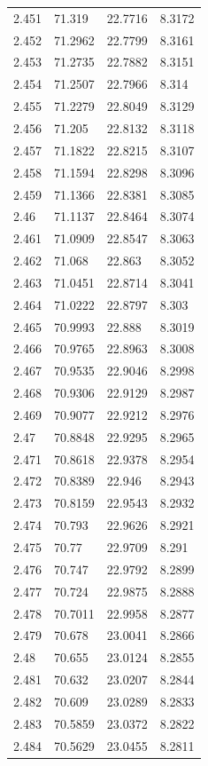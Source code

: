 \begin{tabular}{llll}
2.451 & 71.319 & 22.7716 & 8.3172 \\
2.452 & 71.2962 & 22.7799 & 8.3161 \\
2.453 & 71.2735 & 22.7882 & 8.3151 \\
2.454 & 71.2507 & 22.7966 & 8.314 \\
2.455 & 71.2279 & 22.8049 & 8.3129 \\
2.456 & 71.205 & 22.8132 & 8.3118 \\
2.457 & 71.1822 & 22.8215 & 8.3107 \\
2.458 & 71.1594 & 22.8298 & 8.3096 \\
2.459 & 71.1366 & 22.8381 & 8.3085 \\
2.46 & 71.1137 & 22.8464 & 8.3074 \\
2.461 & 71.0909 & 22.8547 & 8.3063 \\
2.462 & 71.068 & 22.863 & 8.3052 \\
2.463 & 71.0451 & 22.8714 & 8.3041 \\
2.464 & 71.0222 & 22.8797 & 8.303 \\
2.465 & 70.9993 & 22.888 & 8.3019 \\
2.466 & 70.9765 & 22.8963 & 8.3008 \\
2.467 & 70.9535 & 22.9046 & 8.2998 \\
2.468 & 70.9306 & 22.9129 & 8.2987 \\
2.469 & 70.9077 & 22.9212 & 8.2976 \\
2.47 & 70.8848 & 22.9295 & 8.2965 \\
2.471 & 70.8618 & 22.9378 & 8.2954 \\
2.472 & 70.8389 & 22.946 & 8.2943 \\
2.473 & 70.8159 & 22.9543 & 8.2932 \\
2.474 & 70.793 & 22.9626 & 8.2921 \\
2.475 & 70.77 & 22.9709 & 8.291 \\
2.476 & 70.747 & 22.9792 & 8.2899 \\
2.477 & 70.724 & 22.9875 & 8.2888 \\
2.478 & 70.7011 & 22.9958 & 8.2877 \\
2.479 & 70.678 & 23.0041 & 8.2866 \\
2.48 & 70.655 & 23.0124 & 8.2855 \\
2.481 & 70.632 & 23.0207 & 8.2844 \\
2.482 & 70.609 & 23.0289 & 8.2833 \\
2.483 & 70.5859 & 23.0372 & 8.2822 \\
2.484 & 70.5629 & 23.0455 & 8.2811 \\

\end{tabular}
